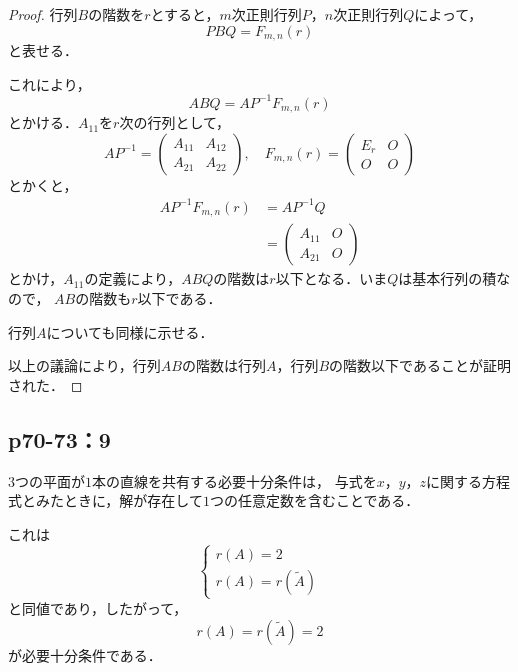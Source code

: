 \documentclass[uplatex,dvipdfmx,a4paper,10pt,fleqn]{jsarticle}
\begin{document}
\begin{leftbar}
    \begin{proof}
        行列$B$の階数を$r$とすると，$m$次正則行列$P$，$n$次正則行列$Q$によって，
        \[
            P B Q = F_{m,n} (r)
        \]
        と表せる．

        これにより，
        \[
            ABQ = A P^{-1} F_{m,n} (r) 
        \]
        とかける．$A_{11}$を$r$次の行列として，
        \[
            A P^{-1} = \begin{pmatrix} A_{11} & A_{12} \\ A_{21} & A_{22} \end{pmatrix}, \quad F_{m,n} (r) = \begin{pmatrix} E_r & O \\ O & O \end{pmatrix}
        \]
        とかくと，
        \begin{align*}
           A P^{-1} F_{m,n} (r)&= A P^{-1} Q \\
           & = \begin{pmatrix} A_{11}& O \\ A_{21} & O \end{pmatrix}
        \end{align*}
        とかけ，$A_{11}$の定義により，$ABQ$の階数は$r$以下となる．いま$Q$は基本行列の積なので， $AB$の階数も$r$以下である．

        行列$A$についても同様に示せる．
        
        以上の議論により，行列$AB$の階数は行列$A$，行列$B$の階数以下であることが証明された．

    \end{proof}
\end{leftbar}

\newpage 


\subsection*{p70-73：9}

\begin{tleftbar}
    $3$つの平面が$1$本の直線を共有する必要十分条件は，
    与式を$x$，$y$，$z$に関する方程式とみたときに，解が存在して$1$つの任意定数を含むことである．

    これは
    \[
        \begin{cases} 
            r(A)=2 \\
            r(A)=r(\tilde{A})
        \end{cases}
    \]
    と同値であり，したがって，
    \[
        r(A)=r(\tilde{A})=2
    \]
    が必要十分条件である．
    \end{tleftbar}
\end{document}

